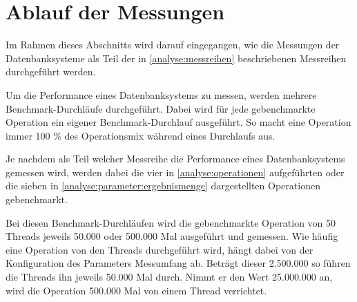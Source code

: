 
\section{Ablauf der Messungen}
Im Rahmen dieses Abschnitts wird darauf eingegangen, wie die Messungen der Datenbanksysteme als Teil der in \autoref{analyse:messreihen} beschriebenen Messreihen durchgeführt werden. 

Um die Performance eines Datenbanksystems zu messen, werden mehrere Benchmark-Durchläufe durchgeführt. Dabei wird für jede gebenchmarkte Operation ein eigener Benchmark-Durchlauf ausgeführt. So macht eine Operation immer 100 \% des Operationsmix während eines Durchlaufs aus. 

Je nachdem als Teil welcher Messreihe die Performance eines Datenbanksystems gemessen wird, werden dabei die vier in \autoref{analyse:operationen} aufgeführten oder die sieben in \autoref{analyse:parameter:ergebnismenge} dargestellten Operationen gebenchmarkt. 

Bei diesen Benchmark-Durchläufen wird die gebenchmarkte Operation von 50 Threads jeweils 50.000 oder 500.000 Mal ausgeführt und gemessen. Wie häufig eine Operation von den Threads durchgeführt wird, hängt dabei von der Konfiguration des Parameters Messumfang ab. Beträgt dieser 2.500.000 so führen die Threads ihn jeweils 50.000 Mal durch. Nimmt er den Wert 25.000.000 an, wird die Operation 500.000 Mal von einem Thread verrichtet. 